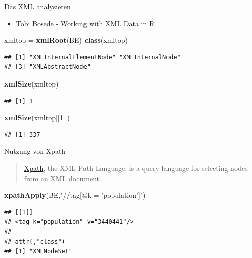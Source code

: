 \documentclass[ignorenonframetext,]{beamer}
\newenvironment{Shaded}{\begin{snugshade}}{\end{snugshade}}
\newcommand{\KeywordTok}[1]{\textcolor[rgb]{0.13,0.29,0.53}{\textbf{#1}}}
\newcommand{\DecValTok}[1]{\textcolor[rgb]{0.00,0.00,0.81}{#1}}
\newcommand{\StringTok}[1]{\textcolor[rgb]{0.31,0.60,0.02}{#1}}
\newcommand{\NormalTok}[1]{#1}
\providecommand{\tightlist}{%
  \setlength{\itemsep}{0pt}\setlength{\parskip}{0pt}}
\begin{document}
\begin{frame}[fragile]{Das XML analysieren}

\begin{itemize}
\tightlist
\item
  \href{http://www.informit.com/articles/article.aspx?p=2215520}{Tobi
  Bosede - Working with XML Data in R}
\end{itemize}

\begin{Shaded}
\begin{Highlighting}[]
\NormalTok{xmltop =}\StringTok{ }\KeywordTok{xmlRoot}\NormalTok{(BE)}
\KeywordTok{class}\NormalTok{(xmltop)}
\end{Highlighting}
\end{Shaded}

\begin{verbatim}
## [1] "XMLInternalElementNode" "XMLInternalNode"       
## [3] "XMLAbstractNode"
\end{verbatim}

\begin{Shaded}
\begin{Highlighting}[]
\KeywordTok{xmlSize}\NormalTok{(xmltop)}
\end{Highlighting}
\end{Shaded}

\begin{verbatim}
## [1] 1
\end{verbatim}

\begin{Shaded}
\begin{Highlighting}[]
\KeywordTok{xmlSize}\NormalTok{(xmltop[[}\DecValTok{1}\NormalTok{]])}
\end{Highlighting}
\end{Shaded}

\begin{verbatim}
## [1] 337
\end{verbatim}

\end{frame}

\begin{frame}[fragile]{Nutzung von Xpath}

\begin{quote}
\href{https://de.wikipedia.org/wiki/XPath}{Xpath}, the XML Path
Language, is a query language for selecting nodes from an XML document.
\end{quote}

\begin{Shaded}
\begin{Highlighting}[]
\KeywordTok{xpathApply}\NormalTok{(BE,}\StringTok{"//tag[@k = 'population']"}\NormalTok{)}
\end{Highlighting}
\end{Shaded}

\begin{verbatim}
## [[1]]
## <tag k="population" v="3440441"/> 
## 
## attr(,"class")
## [1] "XMLNodeSet"
\end{verbatim}

\end{frame}
\end{document}
